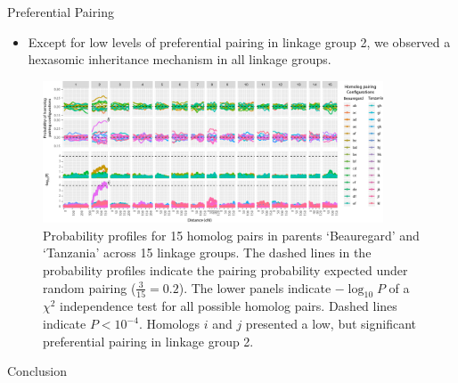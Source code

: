 \documentclass[final, 13pt]{beamer}
\newlength{\twocolwid}
\begin{document}
\begin{frame}[t]
\begin{columns}[t]
\begin{column}{\twocolwid}

\begin{block}{Preferential Pairing}
    \begin{itemize}
    \item Except for low levels of preferential pairing in linkage group 2, we observed a hexasomic inheritance mechanism in all linkage groups.    

    \end{itemize}
    
 \begin{figure}[htp]
      \centering
      \includegraphics[width=0.9\textwidth]{figures/homolog_preferential_pairing_profiles2.png}
      \caption{\hspace{.01cm}Probability profiles for 15 homolog pairs in parents ‘Beauregard’ and ‘Tanzania’ across 15 linkage groups. The dashed lines in the probability profiles indicate the pairing probability expected under random pairing ($\frac{3}{15} = 0.2$).
 The lower panels indicate $-\log_{10}P$ of a $\chi^2$ independence test for all possible homolog pairs. Dashed lines indicate $P < 10^{-4}$. Homologs $i$ and $j$ presented a low, but significant preferential pairing in linkage group 2.} 
    \end{figure}  
\end{block}


\vspace{-.750cm}
\begin{block}{Conclusion}


\end{block}
\end{column}
\end{columns}
\end{frame}
\end{document}
